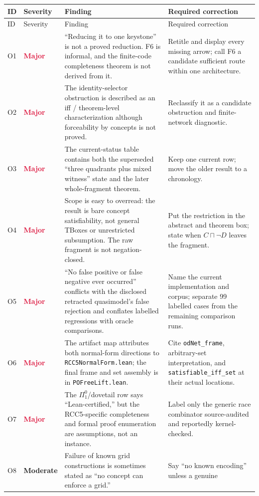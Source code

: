 \documentclass[11pt]{article}
\newcommand{\code}[1]{\texttt{#1}}
\newcommand{\sevmajor}{\textcolor{crimson}{\textbf{Major}}}
\newcommand{\sevmod}{\textcolor{amber}{\textbf{Moderate}}}
\begin{document}
\small
\begin{longtable}{L{0.055\textwidth}L{0.115\textwidth}L{0.37\textwidth}L{0.36\textwidth}}
\toprule
ID & Severity & Finding & Required correction \\
\midrule
\endfirsthead
\toprule
ID & Severity & Finding & Required correction \\
\midrule
\endhead
O1 & \sevmajor & ``Reducing it to one keystone'' is not a proved reduction.
F6 is informal, and the finite-code completeness theorem is not derived from it.
& Retitle and display every missing arrow; call F6 a candidate sufficient route
within one architecture. \\
O2 & \sevmajor & The identity-selector obstruction is described as an iff /
theorem-level characterization although forceability by concepts is not proved.
& Reclassify it as a candidate obstruction and finite-network diagnostic. \\
O3 & \sevmajor & The current-status table contains both the superseded
``three quadrants plus mixed witness'' state and the later whole-fragment theorem.
& Keep one current row; move the older result to a chronology. \\
O4 & \sevmajor & Scope is easy to overread: the result is bare concept
satisfiability, not general TBoxes or unrestricted subsumption.  The raw fragment
is not negation-closed. & Put the restriction in the abstract and theorem box;
state when \(C\sqcap\neg D\) leaves the fragment. \\
O5 & \sevmajor & ``No false positive or false negative ever occurred'' conflicts
with the disclosed retracted quasimodel's false rejection and conflates labelled
regressions with oracle comparisons. & Name the current implementation and corpus;
separate 99 labelled cases from the remaining comparison runs. \\
O6 & \sevmajor & The artifact map attributes both normal-form directions to
\code{RCC5NormalForm.lean}; the final frame and set assembly is in
\code{POFreeLift.lean}. & Cite \code{odNet\_frame}, arbitrary-set interpretation, and
\code{satisfiable\_iff\_set} at their actual locations. \\
O7 & \sevmajor & The \(\Pi^0_1\)/dovetail row says ``Lean-certified,'' but the
RCC5-specific completeness and formal proof enumeration are assumptions, not an
instance. & Label only the generic race combinator source-audited and reportedly
kernel-checked. \\
O8 & \sevmod & Failure of known grid constructions is sometimes stated as ``no
concept can enforce a grid.'' & Say ``no known encoding'' unless a genuine

\end{longtable}
\end{document}
